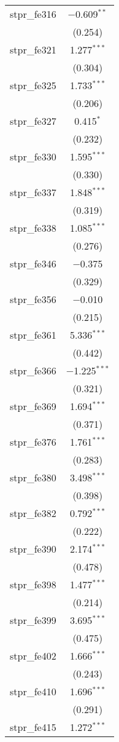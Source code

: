 \begin{table}[!htbp]
\begin{tabular}{@{\extracolsep{5pt}}lc}
  stpr\_fe316 & $-$0.609$^{**}$ \\ 
  & (0.254) \\ 
  stpr\_fe321 & 1.277$^{***}$ \\ 
  & (0.304) \\ 
  stpr\_fe325 & 1.733$^{***}$ \\ 
  & (0.206) \\ 
  stpr\_fe327 & 0.415$^{*}$ \\ 
  & (0.232) \\ 
  stpr\_fe330 & 1.595$^{***}$ \\ 
  & (0.330) \\ 
  stpr\_fe337 & 1.848$^{***}$ \\ 
  & (0.319) \\ 
  stpr\_fe338 & 1.085$^{***}$ \\ 
  & (0.276) \\ 
  stpr\_fe346 & $-$0.375 \\ 
  & (0.329) \\ 
  stpr\_fe356 & $-$0.010 \\ 
  & (0.215) \\ 
  stpr\_fe361 & 5.336$^{***}$ \\ 
  & (0.442) \\ 
  stpr\_fe366 & $-$1.225$^{***}$ \\ 
  & (0.321) \\ 
  stpr\_fe369 & 1.694$^{***}$ \\ 
  & (0.371) \\ 
  stpr\_fe376 & 1.761$^{***}$ \\ 
  & (0.283) \\ 
  stpr\_fe380 & 3.498$^{***}$ \\ 
  & (0.398) \\ 
  stpr\_fe382 & 0.792$^{***}$ \\ 
  & (0.222) \\ 
  stpr\_fe390 & 2.174$^{***}$ \\ 
  & (0.478) \\ 
  stpr\_fe398 & 1.477$^{***}$ \\ 
  & (0.214) \\ 
  stpr\_fe399 & 3.695$^{***}$ \\ 
  & (0.475) \\ 
  stpr\_fe402 & 1.666$^{***}$ \\ 
  & (0.243) \\ 
  stpr\_fe410 & 1.696$^{***}$ \\ 
  & (0.291) \\ 
  stpr\_fe415 & 1.272$^{***}$ \\ 

\end{tabular}
\end{table}
